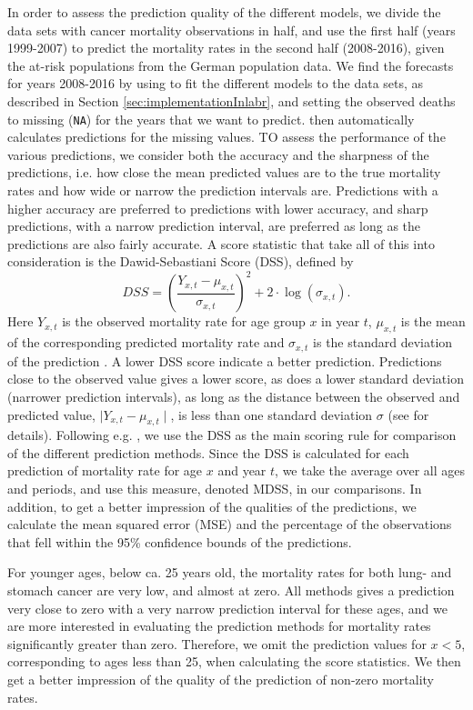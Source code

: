 In order to assess the prediction quality of the different models, we divide the data sets with cancer mortality observations in half, and use the first half (years 1999-2007) to predict the mortality rates in the second half (2008-2016), given the at-risk populations from the German population data. We find the forecasts for years 2008-2016 by using \inlabru to fit the different models to the data sets, as described in Section \ref{sec:implementationInlabr}, and setting the observed deaths to missing (\texttt{NA}) for the years that we want to predict. \inlabru then automatically calculates predictions for the missing values. 
TO assess the performance of the various predictions, we consider both the accuracy and the sharpness of the predictions, i.e. how close the mean predicted values are to the true mortality rates and how wide or narrow the prediction intervals are. Predictions with a higher accuracy are preferred to predictions with lower accuracy, and sharp predictions, with a narrow prediction interval, are preferred as long as the predictions are also fairly accurate. A score statistic that take all of this into consideration is the Dawid-Sebastiani Score (DSS), defined by 
\begin{equation}
    DSS = (\frac{Y_{x,t} - \mu_{x,t}}{\sigma_{x,t}})^2 + 2\cdot \log(\sigma_{x,t}).
\end{equation}
Here $Y_{x,t}$ is the observed mortality rate for age group $x$ in year $t$, $\mu_{x,t}$ is the mean of the corresponding predicted mortality rate and $\sigma_{x,t}$ is the standard deviation of the prediction \cite{Gneiting2007}. A lower DSS score indicate a better prediction. Predictions close to the observed value gives a lower score, as does a lower standard deviation (narrower prediction intervals), as long as the distance between the observed and predicted value, $\mid Y_{x,t} - \mu_{x,t} \mid$, is less than one standard deviation $\sigma$ (see \textcite{Keilman2020} for details). Following e.g. \textcite{RieblerHeldRue2012}, we use the DSS as the main scoring rule for comparison of the different prediction methods. Since the DSS is calculated for each prediction of mortality rate for age $x$ and year $t$, we take the average over all ages and periods, and use this measure, denoted MDSS, in our comparisons. In addition, to get a better impression of the qualities of the predictions, we calculate the mean squared error (MSE) and the percentage of the observations that fell within the 95\% confidence bounds of the predictions.

For younger ages, below ca. 25 years old, the mortality rates for both lung- and stomach cancer are very low, and almost at zero. All methods gives a prediction very close to zero with a very narrow prediction interval for these ages, and we are more interested in evaluating the prediction methods for mortality rates significantly greater than zero. Therefore, we omit the prediction values for $x < 5$, corresponding to ages less than 25, when calculating the score statistics. We then get a better impression of the quality of the prediction of non-zero mortality rates. 

